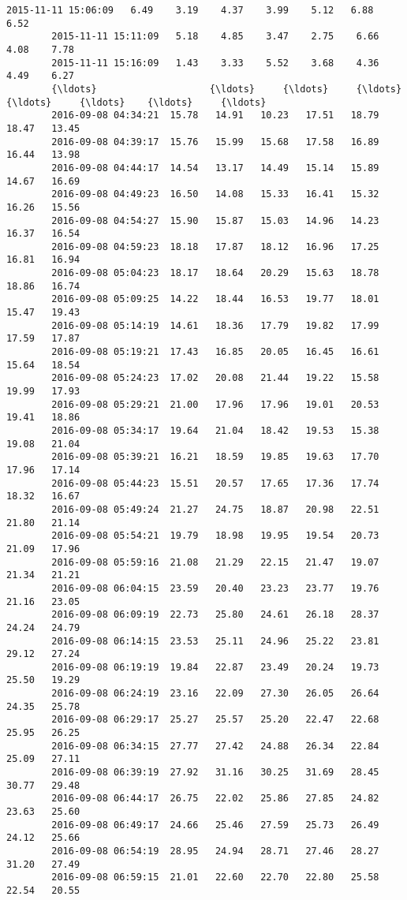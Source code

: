 \documentclass[a4paper,dvipdfmx]{jsarticle}
\begin{document}
\begin{Verbatim}[commandchars=\\\{\}]
        2015-11-11 15:06:09   6.49    3.19    4.37    3.99    5.12   6.88    6.52   
        2015-11-11 15:11:09   5.18    4.85    3.47    2.75    6.66   4.08    7.78   
        2015-11-11 15:16:09   1.43    3.33    5.52    3.68    4.36   4.49    6.27   
        {\ldots}                    {\ldots}     {\ldots}     {\ldots}     {\ldots}     {\ldots}    {\ldots}     {\ldots}   
        2016-09-08 04:34:21  15.78   14.91   10.23   17.51   18.79  18.47   13.45   
        2016-09-08 04:39:17  15.76   15.99   15.68   17.58   16.89  16.44   13.98   
        2016-09-08 04:44:17  14.54   13.17   14.49   15.14   15.89  14.67   16.69   
        2016-09-08 04:49:23  16.50   14.08   15.33   16.41   15.32  16.26   15.56   
        2016-09-08 04:54:27  15.90   15.87   15.03   14.96   14.23  16.37   16.54   
        2016-09-08 04:59:23  18.18   17.87   18.12   16.96   17.25  16.81   16.94   
        2016-09-08 05:04:23  18.17   18.64   20.29   15.63   18.78  18.86   16.74   
        2016-09-08 05:09:25  14.22   18.44   16.53   19.77   18.01  15.47   19.43   
        2016-09-08 05:14:19  14.61   18.36   17.79   19.82   17.99  17.59   17.87   
        2016-09-08 05:19:21  17.43   16.85   20.05   16.45   16.61  15.64   18.54   
        2016-09-08 05:24:23  17.02   20.08   21.44   19.22   15.58  19.99   17.93   
        2016-09-08 05:29:21  21.00   17.96   17.96   19.01   20.53  19.41   18.86   
        2016-09-08 05:34:17  19.64   21.04   18.42   19.53   15.38  19.08   21.04   
        2016-09-08 05:39:21  16.21   18.59   19.85   19.63   17.70  17.96   17.14   
        2016-09-08 05:44:23  15.51   20.57   17.65   17.36   17.74  18.32   16.67   
        2016-09-08 05:49:24  21.27   24.75   18.87   20.98   22.51  21.80   21.14   
        2016-09-08 05:54:21  19.79   18.98   19.95   19.54   20.73  21.09   17.96   
        2016-09-08 05:59:16  21.08   21.29   22.15   21.47   19.07  21.34   21.21   
        2016-09-08 06:04:15  23.59   20.40   23.23   23.77   19.76  21.16   23.05   
        2016-09-08 06:09:19  22.73   25.80   24.61   26.18   28.37  24.24   24.79   
        2016-09-08 06:14:15  23.53   25.11   24.96   25.22   23.81  29.12   27.24   
        2016-09-08 06:19:19  19.84   22.87   23.49   20.24   19.73  25.50   19.29   
        2016-09-08 06:24:19  23.16   22.09   27.30   26.05   26.64  24.35   25.78   
        2016-09-08 06:29:17  25.27   25.57   25.20   22.47   22.68  25.95   26.25   
        2016-09-08 06:34:15  27.77   27.42   24.88   26.34   22.84  25.09   27.11   
        2016-09-08 06:39:19  27.92   31.16   30.25   31.69   28.45  30.77   29.48   
        2016-09-08 06:44:17  26.75   22.02   25.86   27.85   24.82  23.63   25.60   
        2016-09-08 06:49:17  24.66   25.46   27.59   25.73   26.49  24.12   25.66   
        2016-09-08 06:54:19  28.95   24.94   28.71   27.46   28.27  31.20   27.49   
        2016-09-08 06:59:15  21.01   22.60   22.70   22.80   25.58  22.54   20.55   
        

\end{Verbatim}
\end{document}
